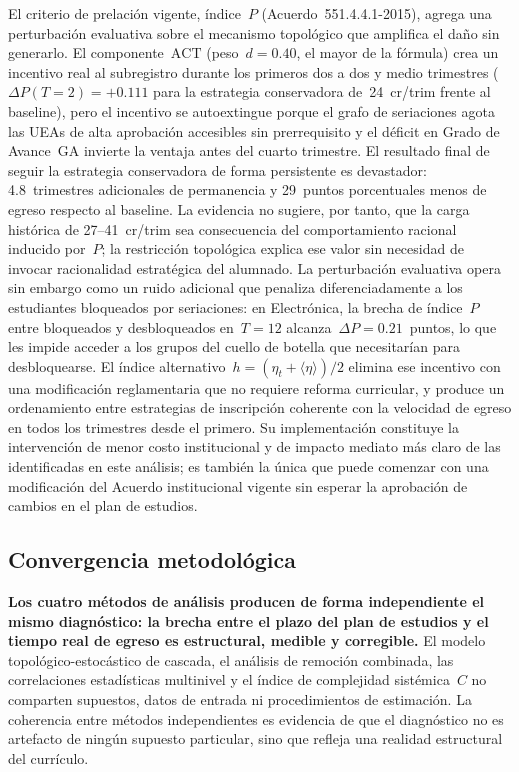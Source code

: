 \documentclass[11pt,letterpaper]{article}
\begin{document}
El criterio de prelación vigente, índice~$P$ (Acuerdo~551.4.4.1-2015), agrega una
perturbación evaluativa sobre el mecanismo topológico que amplifica el daño sin generarlo.
El componente~$\mathrm{ACT}$ (peso~$d=0.40$, el mayor de la fórmula) crea un incentivo
real al subregistro durante los primeros dos a dos y medio trimestres
($\Delta P(T=2)=+0.111$ para la estrategia conservadora de~24~cr/trim frente al baseline),
pero el incentivo se autoextingue porque el grafo de seriaciones agota las UEAs de alta
aprobación accesibles sin prerrequisito y el déficit en Grado de Avance~GA invierte la
ventaja antes del cuarto trimestre.
El resultado final de seguir la estrategia conservadora de forma persistente es devastador:
4.8~trimestres adicionales de permanencia y 29~puntos porcentuales menos de egreso
respecto al baseline.
La evidencia no sugiere, por tanto, que la carga histórica de 27--41~cr/trim sea consecuencia
del comportamiento racional inducido por~$P$; la restricción topológica explica ese valor
sin necesidad de invocar racionalidad estratégica del alumnado.
La perturbación evaluativa opera sin embargo como un ruido adicional que penaliza
diferenciadamente a los estudiantes bloqueados por seriaciones: en Electrónica, la brecha de
índice~$P$ entre bloqueados y desbloqueados en~$T=12$ alcanza~$\Delta P=0.21$~puntos, lo
que les impide acceder a los grupos del cuello de botella que necesitarían para desbloquearse.
El índice alternativo~$h=(\eta_t+\langle\eta\rangle)/2$ elimina ese incentivo con
una modificación reglamentaria que no requiere reforma curricular, y produce un ordenamiento
entre estrategias de inscripción coherente con la velocidad de egreso en todos los
trimestres desde el primero.
Su implementación constituye la intervención de menor costo institucional y de impacto
mediato más claro de las identificadas en este análisis; es también la única que puede
comenzar con una modificación del Acuerdo institucional vigente sin esperar la aprobación
de cambios en el plan de estudios.

\subsection{Convergencia metodológica}
\label{sec:convergencia}

\begin{okbox}
\textbf{Los cuatro métodos de análisis producen de forma independiente el mismo diagnóstico:
la brecha entre el plazo del plan de estudios y el tiempo real de egreso
es estructural, medible y corregible.}
El modelo topológico-estocástico de cascada, el análisis de remoción combinada,
las correlaciones estadísticas multinivel y el índice de complejidad sistémica~$C$
no comparten supuestos, datos de entrada ni procedimientos de estimación.
La coherencia entre métodos independientes es evidencia de que el diagnóstico no
es artefacto de ningún supuesto particular, sino que refleja una realidad estructural del currículo.
\end{okbox}
\end{document}
